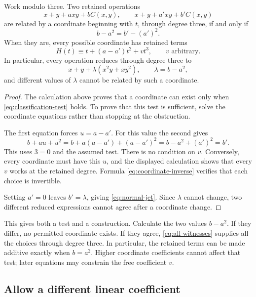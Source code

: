 \begin{theorem}\label{thm:cubic}
Work modulo three. Two retained operations
\[
 x+y+a xy+bC(x,y),\qquad x+y+a'xy+b'C(x,y)
\]
are related by a coordinate beginning with \(t\), through degree three, if and only if
\begin{equation}\label{eq:classification-test}
 b-a^2=b'-(a')^2.
\end{equation}
When they are, every possible coordinate has retained terms
\begin{equation}\label{eq:all-witnesses}
 H(t)\equiv t+(a-a')t^2+vt^3,
 \qquad v\text{ arbitrary}.
\end{equation}
In particular, every operation reduces through degree three to
\begin{equation}\label{eq:normal-jet}
 x+y+\lambda(x^2y+xy^2),\qquad \lambda=b-a^2,
\end{equation}
and different values of \(\lambda\) cannot be related by such a coordinate.
\end{theorem}

\begin{proof}
The calculation above proves that a coordinate can exist only when \eqref{eq:classification-test} holds. To prove that this test is sufficient, solve the coordinate equations rather than stopping at the obstruction.

The first equation forces \(u=a-a'\). For this value the second gives
\[
 b+au+u^2=b+a(a-a')+(a-a')^2
 =b-a^2+(a')^2=b'.
\]
This uses \(3=0\) and the assumed test. There is no condition on \(v\). Conversely, every coordinate must have this \(u\), and the displayed calculation shows that every \(v\) works at the retained degree. Formula \eqref{eq:coordinate-inverse} verifies that each choice is invertible.

Setting \(a'=0\) leaves \(b'=\lambda\), giving \eqref{eq:normal-jet}. Since \(\lambda\) cannot change, two different reduced expressions cannot agree after a coordinate change.
\end{proof}

This gives both a test and a construction. Calculate the two values \(b-a^2\). If they differ, no permitted coordinate exists. If they agree, \eqref{eq:all-witnesses} supplies all the choices through degree three. In particular, the retained terms can be made additive exactly when \(b=a^2\). Higher coordinate coefficients cannot affect that test; later equations may constrain the free coefficient \(v\).

\subsection{Allow a different linear coefficient}

